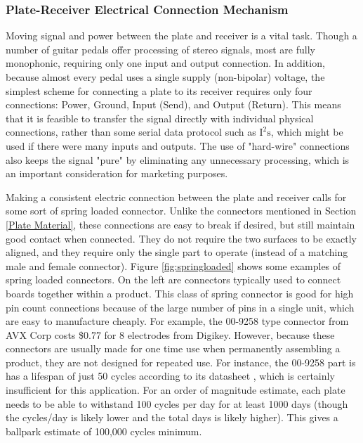 \documentclass{article}
\begin{document}
		\subsubsection{Plate-Receiver Electrical Connection Mechanism}
		\label{Pogo Pins}
		Moving signal and power between the plate and receiver is a vital task.  Though a number of guitar pedals offer processing of stereo signals, most are fully monophonic, requiring only one input and output connection.  In addition, because almost every pedal uses a single supply (non-bipolar) voltage, the simplest scheme for connecting a plate to its receiver requires only four connections: Power, Ground, Input (Send), and Output (Return).  This means that it is feasible to transfer the signal directly with individual physical connections, rather than some serial data protocol such as $\text{I}^2\text{s}$, which might be used if there were many inputs and outputs.  The use of "hard-wire" connections also keeps the signal "pure" by eliminating any unnecessary processing, which is an important consideration for marketing purposes.

		Making a consistent electric connection between the plate and receiver calls for some sort of spring loaded connector.  Unlike the connectors mentioned in Section \ref{Plate Material}, these connections are easy to break if desired, but still maintain good contact when connected.  They do not require the two surfaces to be exactly aligned, and they require only the single part to operate (instead of a matching male and female connector).  Figure \ref{fig:springloaded} shows some examples of spring loaded connectors.  On the left are connectors typically used to connect boards together within a product.  This class of spring connector is good for high pin count connections because of the large number of pins in a single unit, which are easy to manufacture cheaply.  For example, the 00-9258 type connector from AVX Corp costs \$0.77 for 8 electrodes from Digikey.  However, because these connectors are usually made for one time use when permanently assembling a product, they are not designed for repeated use.  For instance, the 00-9258 part is has a lifespan of just 50 cycles according to its datasheet \cite{AVX_00-9258_Datasheet}, which is certainly insufficient for this application.  For an order of magnitude estimate, each plate needs to be able to withstand 100 cycles per day for at least 1000 days (though the cycles/day is likely lower and the total days is likely higher).  This gives a ballpark estimate of 100,000 cycles minimum.
\end{document}
